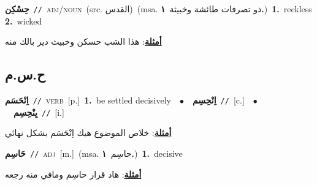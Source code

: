 \documentclass[10pt,a4paper,twoside]{article} %
\begin{document}
\begin{multicols}{2}
{\setlength\topsep{0pt}\textbf{\foreignlanguage{arabic}{حِسْكِن}}\ {\color{gray}\texttt{//}\color{black}}\ \textsc{adj/noun}\ (src. \color{gray}\foreignlanguage{arabic}{القدس}\color{black})\ \color{gray}(msa. \foreignlanguage{arabic}{ذو تصرفات طائشة وخبيثة}~\foreignlanguage{arabic}{\textbf{١.}})\color{black}\ \textbf{1.}~reckless  \textbf{2.}~wicked\  \begin{flushright}\color{gray}\foreignlanguage{arabic}{\textbf{\underline{\foreignlanguage{arabic}{أمثلة}}}: هذا الشب حسكن وخبيث دير بالك منه}\end{flushright}\color{black}} \vspace{2mm}

\vspace{-3mm}
\subsection*{\color{blue}\foreignlanguage{arabic}{ح.س.م}\color{blue}{}} 

{\setlength\topsep{0pt}\textbf{\foreignlanguage{arabic}{اِنْحَسَم}}\ {\color{gray}\texttt{//}\color{black}}\ \textsc{verb}\ [p.]\ \textbf{1.}~be settled decisively\ \ $\bullet$\ \ \setlength\topsep{0pt}\textbf{\foreignlanguage{arabic}{اِنْحِسِم}}\ {\color{gray}\texttt{//}\color{black}}\ [c.]\ \ $\bullet$\ \ \setlength\topsep{0pt}\textbf{\foreignlanguage{arabic}{يِنْحِسِم}}\ {\color{gray}\texttt{//}\color{black}}\ [i.]\  \begin{flushright}\color{gray}\foreignlanguage{arabic}{\textbf{\underline{\foreignlanguage{arabic}{أمثلة}}}: خلاص الموضوع هيك اِنْحَسَم بشكل نهائي}\end{flushright}\color{black}} \vspace{2mm}

{\setlength\topsep{0pt}\textbf{\foreignlanguage{arabic}{حَاسِم}}\ {\color{gray}\texttt{//}\color{black}}\ \textsc{adj}\ [m.]\ \color{gray}(msa. \foreignlanguage{arabic}{حاسِم}~\foreignlanguage{arabic}{\textbf{١.}})\color{black}\ \textbf{1.}~decisive\  \begin{flushright}\color{gray}\foreignlanguage{arabic}{\textbf{\underline{\foreignlanguage{arabic}{أمثلة}}}: هاد قرار حاسِم ومافي منه رجعه}\end{flushright}\color{black}} \vspace{2mm}


\end{multicols}
\end{document}
